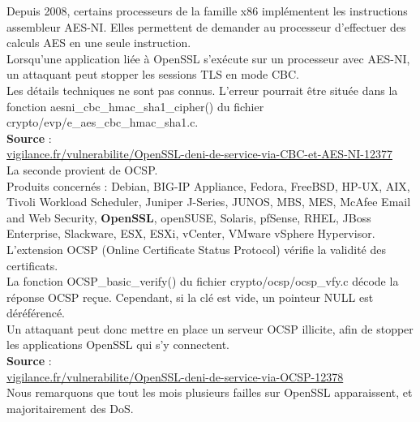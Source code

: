 \documentclass{article}
\begin{document}
	Depuis 2008, certains processeurs de la famille x86 implémentent les 
	instructions assembleur AES-NI. Elles permettent de demander au processeur 
	d'effectuer des calculs AES en une seule instruction.\\

	Lorsqu'une application liée à OpenSSL s'exécute sur un processeur avec AES-NI, 
	un attaquant peut stopper les sessions TLS en mode CBC.\\

	Les détails techniques ne sont pas connus. L'erreur pourrait être située 
	dans la fonction aesni\_cbc\_hmac\_sha1\_cipher() du fichier 
	crypto/evp/e\_aes\_cbc\_hmac\_sha1.c.\\

	\textbf{Source} : \\
	\href{http://vigilance.fr/vulnerabilite/OpenSSL-deni-de-service-via-CBC-et-AES-NI-12377}
	{vigilance.fr/vulnerabilite/OpenSSL-deni-de-service-via-CBC-et-AES-NI-12377}\\

	La seconde provient de OCSP.\\
	
	Produits concernés : Debian, BIG-IP Appliance, Fedora, FreeBSD, HP-UX, AIX, 
	Tivoli Workload Scheduler, Juniper J-Series, JUNOS, MBS, MES, McAfee Email 
	and Web Security, \textbf{OpenSSL}, openSUSE, Solaris, pfSense, RHEL, 
	JBoss Enterprise, Slackware, ESX, ESXi, vCenter, VMware vSphere Hypervisor.\\
	
	L'extension OCSP (Online Certificate Status Protocol) vérifie la validité 
	des certificats.\\

	La fonction OCSP\_basic\_verify() du fichier crypto/ocsp/ocsp\_vfy.c décode 
	la réponse OCSP reçue. Cependant, si la clé est vide, un pointeur NULL est 
	déréférencé.\\

	Un attaquant peut donc mettre en place un serveur OCSP illicite, 
	afin de stopper les applications OpenSSL qui s'y connectent.\\
	
	\textbf{Source} : \\
	\href{http://vigilance.fr/vulnerabilite/OpenSSL-deni-de-service-via-OCSP-12378}
	{vigilance.fr/vulnerabilite/OpenSSL-deni-de-service-via-OCSP-12378}\\

	Nous remarquons que tout les mois plusieurs failles sur OpenSSL apparaissent, et
	majoritairement des DoS.\\ 
	
\end{document}
